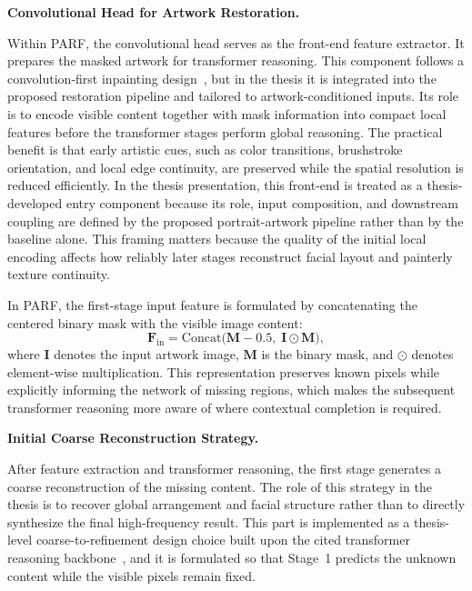 \documentclass[12pt, twoside]{report}
\begin{document}
\vspace{0.35\baselineskip}
\noindent\textbf{Convolutional Head for Artwork Restoration.}\par

Within PARF, the convolutional head serves as the front-end feature extractor. It prepares the masked artwork for transformer reasoning. This component follows a convolution-first inpainting design~\cite{li2022mat}, but in the thesis it is integrated into the proposed restoration pipeline and tailored to artwork-conditioned inputs. Its role is to encode visible content together with mask information into compact local features before the transformer stages perform global reasoning. The practical benefit is that early artistic cues, such as color transitions, brushstroke orientation, and local edge continuity, are preserved while the spatial resolution is reduced efficiently.
In the thesis presentation, this front-end is treated as a thesis-developed entry component because its role, input composition, and downstream coupling are defined by the proposed portrait-artwork pipeline rather than by the baseline alone. This framing matters because the quality of the initial local encoding affects how reliably later stages reconstruct facial layout and painterly texture continuity.

In PARF, the first-stage input feature is formulated by concatenating the centered binary mask with the visible image content:
\begin{equation}
\mathbf{F}_{\mathrm{in}} = \mathrm{Concat}\big(\mathbf{M} - 0.5,\; \mathbf{I} \odot \mathbf{M}\big),
\end{equation}
where $\mathbf{I}$ denotes the input artwork image, $\mathbf{M}$ is the binary mask, and $\odot$ denotes element-wise multiplication. This representation preserves known pixels while explicitly informing the network of missing regions, which makes the subsequent transformer reasoning more aware of where contextual completion is required.

\vspace{0.35\baselineskip}
\noindent\textbf{Initial Coarse Reconstruction Strategy.}\par

After feature extraction and transformer reasoning, the first stage generates a coarse reconstruction of the missing content. The role of this strategy in the thesis is to recover global arrangement and facial structure rather than to directly synthesize the final high-frequency result. This part is implemented as a thesis-level coarse-to-refinement design choice built upon the cited transformer reasoning backbone~\cite{li2022mat}, and it is formulated so that Stage~1 predicts the unknown content while the visible pixels remain fixed.
\end{document}
